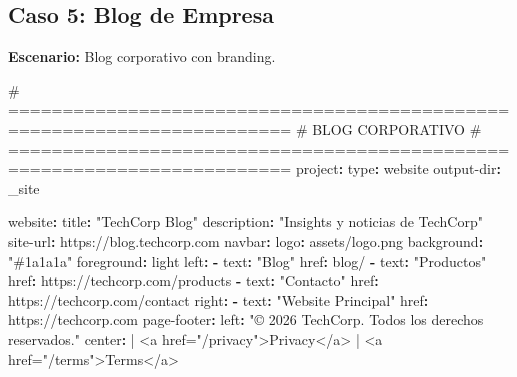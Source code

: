 \documentclass[
  doc,
  floatsintext,
  longtable,
  a4paper,
  nolmodern,
  notxfonts,
  notimes,
  12pt,
  colorlinks=true,linkcolor=blue,citecolor=blue,urlcolor=blue]{apa7}
\newenvironment{Shaded}{\begin{snugshade}}{\end{snugshade}}
\newcommand{\AttributeTok}[1]{\textcolor[rgb]{0.40,0.45,0.13}{#1}}
\newcommand{\CharTok}[1]{\textcolor[rgb]{0.13,0.47,0.30}{#1}}
\newcommand{\CommentTok}[1]{\textcolor[rgb]{0.37,0.37,0.37}{#1}}
\newcommand{\FunctionTok}[1]{\textcolor[rgb]{0.28,0.35,0.67}{#1}}
\newcommand{\KeywordTok}[1]{\textcolor[rgb]{0.00,0.23,0.31}{\textbf{#1}}}
\newcommand{\NormalTok}[1]{\textcolor[rgb]{0.00,0.23,0.31}{#1}}
\newcommand{\StringTok}[1]{\textcolor[rgb]{0.13,0.47,0.30}{#1}}
\begin{document}
\subsection{Caso 5: Blog de Empresa}\label{caso-5-blog-de-empresa}

\textbf{Escenario:} Blog corporativo con branding.

\begin{Shaded}
\begin{Highlighting}[]
\CommentTok{\# ========================================================================}
\CommentTok{\# BLOG CORPORATIVO}
\CommentTok{\# ========================================================================}
\FunctionTok{project}\KeywordTok{:}
\AttributeTok{  }\FunctionTok{type}\KeywordTok{:}\AttributeTok{ website}
\AttributeTok{  }\FunctionTok{output{-}dir}\KeywordTok{:}\AttributeTok{ \_site}

\FunctionTok{website}\KeywordTok{:}
\AttributeTok{  }\FunctionTok{title}\KeywordTok{:}\AttributeTok{ }\StringTok{"TechCorp Blog"}
\AttributeTok{  }\FunctionTok{description}\KeywordTok{:}\AttributeTok{ }\StringTok{"Insights y noticias de TechCorp"}
\AttributeTok{  }\FunctionTok{site{-}url}\KeywordTok{:}\AttributeTok{ https://blog.techcorp.com}
\AttributeTok{  }
\AttributeTok{  }\FunctionTok{navbar}\KeywordTok{:}
\AttributeTok{    }\FunctionTok{logo}\KeywordTok{:}\AttributeTok{ assets/logo.png}
\AttributeTok{    }\FunctionTok{background}\KeywordTok{:}\AttributeTok{ }\StringTok{"\#1a1a1a"}
\AttributeTok{    }\FunctionTok{foreground}\KeywordTok{:}\AttributeTok{ light}
\AttributeTok{    }\FunctionTok{left}\KeywordTok{:}
\AttributeTok{      }\KeywordTok{{-}}\AttributeTok{ }\FunctionTok{text}\KeywordTok{:}\AttributeTok{ }\StringTok{"Blog"}
\AttributeTok{        }\FunctionTok{href}\KeywordTok{:}\AttributeTok{ blog/}
\AttributeTok{      }\KeywordTok{{-}}\AttributeTok{ }\FunctionTok{text}\KeywordTok{:}\AttributeTok{ }\StringTok{"Productos"}
\AttributeTok{        }\FunctionTok{href}\KeywordTok{:}\AttributeTok{ https://techcorp.com/products}
\AttributeTok{      }\KeywordTok{{-}}\AttributeTok{ }\FunctionTok{text}\KeywordTok{:}\AttributeTok{ }\StringTok{"Contacto"}
\AttributeTok{        }\FunctionTok{href}\KeywordTok{:}\AttributeTok{ https://techcorp.com/contact}
\AttributeTok{    }\FunctionTok{right}\KeywordTok{:}
\AttributeTok{      }\KeywordTok{{-}}\AttributeTok{ }\FunctionTok{text}\KeywordTok{:}\AttributeTok{ }\StringTok{"Website Principal"}
\AttributeTok{        }\FunctionTok{href}\KeywordTok{:}\AttributeTok{ https://techcorp.com}
\AttributeTok{  }
\AttributeTok{  }\FunctionTok{page{-}footer}\KeywordTok{:}
\AttributeTok{    }\FunctionTok{left}\KeywordTok{:}\AttributeTok{ }\StringTok{"© 2026 TechCorp. Todos los derechos reservados."}
\FunctionTok{    center}\KeywordTok{: }\CharTok{|}
\NormalTok{      \textless{}a href="/privacy"\textgreater{}Privacy\textless{}/a\textgreater{} | }
\NormalTok{      \textless{}a href="/terms"\textgreater{}Terms\textless{}/a\textgreater{}}


\end{Highlighting}
\end{Shaded}
\end{document}
